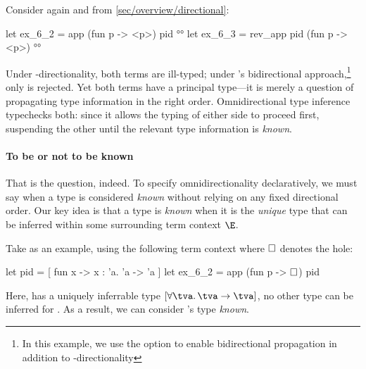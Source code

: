 \documentclass[acmsmall,screen,nonacm%
\Anonymous{,anonymous}{}%
\Final{}{,review}%
]{acmart}
\begin{document}
%
Consider again  and  from
\cref{sec/overview/directional}: 
\begin{program}
let ex_6_2 = app (fun p -> <p>) pid     °°
let ex_6_3 = rev_app pid (fun p -> <p>) °°
\end{program}
%
Under \geninst-directionality, both terms are ill-typed; under \OCaml's
bidirectional approach,\footnote {In this example, we use the option
 to enable bidirectional propagation in 
addition to \geninst-directionality} only
 is rejected. Yet both terms have a principal type---it is
merely a question of propagating type information in the right
order. Omnidirectional type inference typechecks both: since it allows the
typing of either side to proceed first, suspending the other until the
relevant type information is \emph{known}.

\paragraph{To be or not to be known}
\label{sec/overview/omni/unicity}


That is the question, indeed. To specify omnidirectionality declaratively, we
must say when a type is considered \emph{known} without relying on any fixed
directional order. Our key idea is that a type is \emph{known} when it is the
\emph{unique} type that can be inferred within some surrounding term context
$\E$.


Take  as an example, using the following term context where
$\square$ denotes the hole:
%
\begin{program}[input, mathescape=true]
let pid = [ fun x -> x : 'a. 'a -> 'a ]
let ex_6_2 = app (fun p -> $\square$) pid
\end{program}
%
Here,  has a uniquely inferrable type $\tpoly {\tfor \tv
{\tv \to \tv}}$, no other type can be inferred for . As a result, we
can consider 's type \emph{known}.

\end{document}
